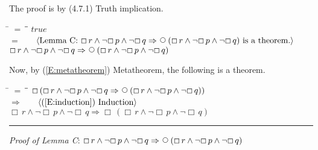 \documentclass[12pt, fleqn, leqno]{article}
\newcommand{\lgap}{2pt}                             %
\newcommand{\mymathindent}{24pt}                    %
\newcommand{\impl}{\ensuremath{\Rightarrow}}        %
\newcommand{\Next}{\;\,\text{\raisebox{3.5pt}{\circle{6}}}}
\newcommand{\Always}{\Box\,}
\newcommand{\myqed}{\rule[-.23ex]{1.2ex}{2.0ex}}
\newcommand{\myqedtab}{\hspace{384pt}}              %
\newcommand{\Gll} {\langle}                         %
\newcommand{\Ggg} {\rangle}                         %
\newcommand{\Hint}[1]     {\ \ \ $\Gll              \mbox{#1} \Ggg$ }   %
\begin{document}
The proof is by (4.7.1) Truth implication.
\begin{tabbing}
\hspace{\mymathindent} \= $= \;$ \= \myqedtab \= \kill
\> \>   $true$\\[\lgap]
 \> $=$  \>  \Hint{Lemma C: $\Always r \land \neg \Always p \land \neg \Always q \impl \Next (\Always r \land \neg \Always p \land \neg \Always q )$ is a theorem.}\\[\lgap]
  \> \>   $\Always r \land \neg \Always p \land \neg \Always q \impl \Next (\Always r \land \neg \Always p \land \neg \Always q )$
  \end{tabbing}
Now, by (\ref{E:metatheorem}) Metatheorem, the following is a theorem.
\begin{tabbing}
\hspace{\mymathindent} \= $= \;$ \= \myqedtab \= \kill
   \> \>   $\Always (\Always r \land \neg \Always p \land \neg \Always q  \impl \Next (\Always r \land \neg \Always p \land \neg \Always q ))$\\[\lgap]
 \> $\impl$  \>  \Hint{(\ref{E:induction}) Induction}\\[\lgap]
 \> \>   $\Always r \land \neg \Always p \land \neg \Always q  \impl \Always (\Always r \land \neg \Always p \land \neg \Always q )$ \quad \myqed
\end{tabbing}
\emph{Proof of Lemma C}:
$\Always r \land \neg \Always p \land \neg \Always q \impl \Next (\Always r \land \neg \Always p \land \neg \Always q)$
\end{document}
